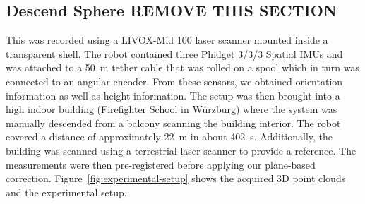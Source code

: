 \documentclass[5p]{elsarticle}
\begin{document}
	\subsection{Descend Sphere REMOVE THIS SECTION}

	This was recorded using a LIVOX-Mid 100 laser scanner mounted inside a transparent shell. 
	The robot contained three Phidget 3/3/3 Spatial IMUs and was attached to a \SI{50}{\meter} tether cable that was rolled on a spool which in turn was connected to an angular encoder. 
	From these sensors, we obtained orientation information as well as height information. 
	The setup was then brought into a high indoor building (\href{https://www.sfs-w.de/feuerwehrschule/virtueller-rundgang.html}{Firefighter School in Würzburg}) where the system was manually descended from a balcony scanning the building interior.
	The robot covered a distance of approximately \SI{22}{\meter} in about \SI{402}{\second}.
	Additionally, the building was scanned using a terrestrial laser scanner to provide a reference.
	The measurements were then pre-registered before applying our plane-based correction. 
	Figure~\ref{fig:experimental-setup} shows the acquired 3D point clouds and the experimental setup. 
\end{document}
